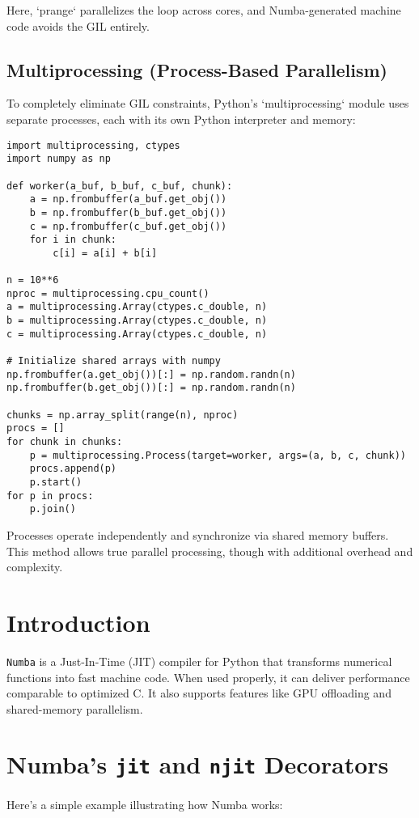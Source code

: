 \documentclass[11pt,a4paper]{book}
\begin{document}
Here, `prange` parallelizes the loop across cores, and Numba-generated machine code avoids the GIL entirely.

\subsection{Multiprocessing (Process-Based Parallelism)}

To completely eliminate GIL constraints, Python's `multiprocessing` module uses separate processes, each with its own Python interpreter and memory:

\begin{lstlisting}
import multiprocessing, ctypes
import numpy as np

def worker(a_buf, b_buf, c_buf, chunk):
    a = np.frombuffer(a_buf.get_obj())
    b = np.frombuffer(b_buf.get_obj())
    c = np.frombuffer(c_buf.get_obj())
    for i in chunk:
        c[i] = a[i] + b[i]

n = 10**6
nproc = multiprocessing.cpu_count()
a = multiprocessing.Array(ctypes.c_double, n)
b = multiprocessing.Array(ctypes.c_double, n)
c = multiprocessing.Array(ctypes.c_double, n)

# Initialize shared arrays with numpy
np.frombuffer(a.get_obj())[:] = np.random.randn(n)
np.frombuffer(b.get_obj())[:] = np.random.randn(n)

chunks = np.array_split(range(n), nproc)
procs = []
for chunk in chunks:
    p = multiprocessing.Process(target=worker, args=(a, b, c, chunk))
    procs.append(p)
    p.start()
for p in procs:
    p.join()
\end{lstlisting}

Processes operate independently and synchronize via shared memory buffers. This method allows true parallel processing, though with additional overhead and complexity.

\pagebreak

\section*{Introduction}
\texttt{Numba} is a Just-In-Time (JIT) compiler for Python that transforms numerical functions into fast machine code. When used properly, it can deliver performance comparable to optimized C. It also supports features like GPU offloading and shared-memory parallelism.

\section{Numba’s \texttt{jit} and \texttt{njit} Decorators}
Here’s a simple example illustrating how Numba works:
\end{document}
